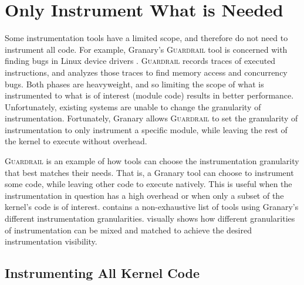 \documentclass[preprint]{sigplanconf}
\newcommand{\toolname}[1]{{\scshape #1}}
\begin{document}
\section{Only Instrument What is Needed}\label{sec:what}

Some instrumentation tools have a limited scope, and therefore do not need to instrument all code. For example, Granary's \toolname{Guardrail} tool is concerned with finding bugs in Linux device drivers \cite{Guardrail}. \toolname{Guardrail} records traces of executed instructions, and analyzes those traces to find memory access and concurrency bugs. Both phases are heavyweight, and so limiting the scope of what is instrumented to what is of interest (module code) results in better performance. Unfortunately, existing systems are unable to change the granularity of instrumentation. Fortunately, Granary allows \toolname{Guardrail} to set the granularity of instrumentation to only instrument a specific module, while leaving the rest of the kernel to execute without overhead.

\toolname{Guardrail} is an example of how tools can choose the instrumentation granularity that best matches their needs. That is, a Granary tool can choose to instrument some code, while leaving other code to execute natively. This is useful when the instrumentation in question has a high overhead or when only a subset of the kernel's code is of interest.  contains a non-exhaustive list of tools using Granary's different instrumentation granularities.  visually shows how different granularities of instrumentation can be mixed and matched to achieve the desired instrumentation visibility.

\subsection{Instrumenting All Kernel Code}
\end{document}
